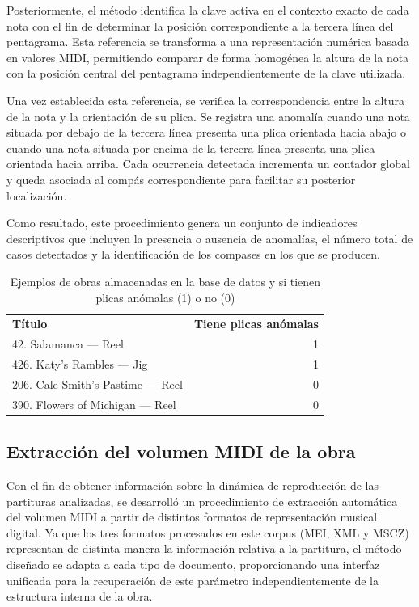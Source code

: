 Posteriormente, el método identifica la clave activa en el contexto exacto de cada nota con el fin de determinar la posición correspondiente a la tercera línea del pentagrama. Esta referencia se transforma a una representación numérica basada en valores MIDI, permitiendo comparar de forma homogénea la altura de la nota con la posición central del pentagrama independientemente de la clave utilizada.

Una vez establecida esta referencia, se verifica la correspondencia entre la altura de la nota y la orientación de su plica. Se registra una anomalía cuando una nota situada por debajo de la tercera línea presenta una plica orientada hacia abajo o cuando una nota situada por encima de la tercera línea presenta una plica orientada hacia arriba. Cada ocurrencia detectada incrementa un contador global y queda asociada al compás correspondiente para facilitar su posterior localización.

Como resultado, este procedimiento genera un conjunto de indicadores descriptivos que incluyen la presencia o ausencia de anomalías, el número total de casos detectados y la identificación de los compases en los que se producen.

\begin{table}[H]
\centering
\begin{tabular}{lr}
\textbf{Título} & \textbf{Tiene plicas anómalas} \\
42.  Salamanca — Reel & 1 \\
426.  Katy’s Rambles — Jig & 1 \\
206.  Cale Smith’s Pastime — Reel & 0 \\
390.  Flowers of Michigan — Reel & 0 \\
\end{tabular}
\caption{Ejemplos de obras almacenadas en la base de datos y si tienen plicas anómalas (1) o no (0)}
\end{table}

\subsection{Extracción del volumen MIDI de la obra}
Con el fin de obtener información sobre la dinámica de reproducción de las partituras analizadas, se desarrolló un procedimiento de extracción automática del volumen MIDI a partir de distintos formatos de representación musical digital.
Ya que los tres formatos procesados en este corpus (MEI, XML y MSCZ) representan de distinta manera la información relativa a la partitura, el método diseñado se adapta a cada tipo de documento, proporcionando una interfaz unificada para la recuperación de este parámetro independientemente de la estructura interna de la obra.

